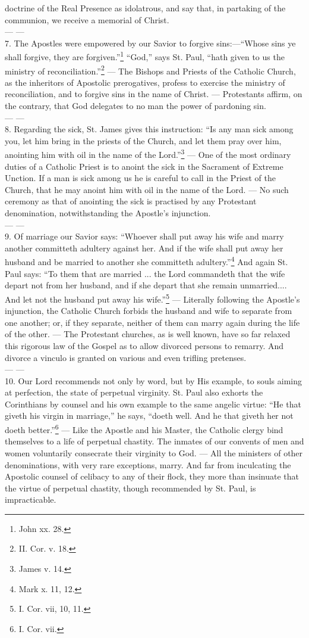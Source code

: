 doctrine of the Real Presence as idolatrous, and say that, in partaking of the
communion, we receive a memorial of Christ. \\
— — \\
7. The Apostles were empowered by our Savior to forgive sins:—“Whose
sins ye shall forgive, they are forgiven.”\footnote{John xx.
28.} “God,” says St. Paul, “hath given to us the ministry of
reconciliation.”\footnote{II. Cor. v. 18.} — The Bishops and Priests of the Catholic Church, as the inheritors of
Apostolic prerogatives, profess to exercise the ministry of reconciliation, and
to forgive sins in the name of Christ. — Protestants affirm, on the contrary, that God delegates to no man
the power of pardoning sin. \\
— — \\
8. Regarding the sick, St. James gives this instruction: “Is any man sick
among you, let him bring in the priests of the Church, and let them pray over him,
anointing him with oil in the name of the Lord.”\footnote{James v.
14.} — One of the most ordinary duties of a Catholic Priest is to anoint the sick in
the Sacrament of Extreme Unction. If a man is sick among us he is careful to call
in the Priest of the Church, that he may anoint him with oil in the name of the
Lord. — No such ceremony as that of anointing the sick is practised by any Protestant
denomination, notwithstanding the Apostle's injunction. \\
— — \\
9. Of marriage our Savior says: “Whoever shall put away his wife and marry
another committeth adultery against her. And if the wife shall put away her
husband and be married to another she committeth
adultery.”\footnote{Mark x. 11, 12.} And again St. Paul says:
“To them that are married ... the Lord commandeth that the wife depart not from
her husband, and if she depart that she remain unmarried.... And let not the
husband put away his wife.”\footnote{I. Cor. vii, 10,
11.} — Literally following the Apostle's injunction, the Catholic Church forbids the
husband and wife to separate from one another; or, if they separate, neither of
them can marry again during the life of the other. — The Protestant churches, as is well known, have so far relaxed this rigorous
law of the Gospel as to allow divorced persons to remarry. And divorce
a vinculo is granted on various and even trifling
pretenses. \\
— — \\
10. Our Lord recommends not only by word, but by His example, to souls aiming
at perfection, the state of perpetual virginity. St. Paul also exhorts the
Corinthians by counsel and his own example to the same angelic virtue: “He
that giveth his virgin in marriage,” he says, “doeth well. And he that
giveth her not doeth better.”\footnote{I. Cor. vii.} — Like the Apostle and his Master, the Catholic clergy bind themselves to a
life of perpetual chastity. The inmates of our convents of men and women
voluntarily consecrate their virginity to God. — All the ministers of other denominations, with very rare exceptions, marry.
And far from inculcating the Apostolic counsel of celibacy to any of their
flock, they more than insinuate that the virtue of perpetual chastity, though
recommended by St. Paul, is impracticable.

